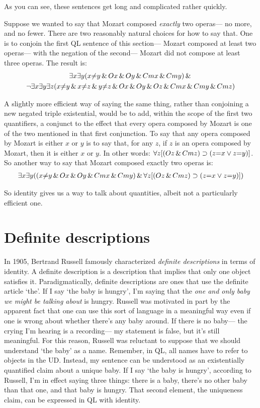 As you can see, these sentences get long and complicated rather quickly.

Suppose we wanted to say that Mozart composed \emph{exactly} two operas--- no more, and no fewer. There are two reasonably natural choices for how to say that. One is to conjoin the first QL sentence of this section--- Mozart composed at least two operas--- with the negation of the second--- Mozart did not compose at least three operas. The result is:
\begin{multline*}
\exists x \exists y (x {\neq} y \,\&\, Ox \,\&\, Oy \,\&\, Cmx \,\&\, Cmy) \,\&\, \\ \neg \exists x \exists y \exists z (x {\neq} y \,\&\, x {\neq} z \,\&\, y {\neq} z \,\&\, Ox \,\&\, Oy \,\&\, Oz \,\&\, Cmx \,\&\, Cmy \,\&\, Cmz)
\end{multline*}

A slightly more efficient way of saying the same thing, rather than conjoining a new negated triple existential, would be to add, within the scope of the first two quantifiers, a conjunct to the effect that every opera composed by Mozart is one of the two mentioned in that first conjunction. To say that any opera composed by Mozart is either $x$ or $y$ is to say that, for any $z$, if $z$ is an opera composed by Mozart, then it is either $x$ or $y$. In other words: $\forall z [(Oz \,\&\, Cmz) \supset (z{=}x \vee z{=}y)]$. So another way to say that Mozart composed exactly two operas is:
\begin{multline*}
\exists x \exists y ((x {\neq} y  \,\&\,  Ox \,\&\, Oy \,\&\,  Cmx \,\&\, Cmy) \,\&\, \forall z [(Oz \,\&\, Cmz) \supset (z{=}x \vee z{=}y)])
\end{multline*}

So identity gives us a way to talk about quantities, albeit not a particularly efficient one.



\section{Definite descriptions}
\label{sec.defdesc}
In 1905, Bertrand Russell famously characterized \emph{definite descriptions} in terms of identity. A definite description is a description that implies that only one object satisfies it. Paradigmatically, definite descriptions are ones that use the definite article `the'. If I say `the baby is hungry', I'm saying that the \emph{one and only baby we might be talking about} is hungry. Russell was motivated in part by the apparent fact that one can use this sort of language in a meaningful way even if one is wrong about whether there's any baby around. If there is no baby--- the crying I'm hearing is a recording--- my statement is false, but it's still meaningful. For this reason, Russell was reluctant to suppose that we should understand `the baby' as a name. Remember, in QL, all names have to refer to objects in the UD. Instead, my sentence can be understood as an existentially quantified claim about a unique baby. If I say `the baby is hungry', according to Russell, I'm in effect saying three things: there is a baby, there's no other baby than that one, and that baby is hungry. That second element, the uniqueness claim, can be expressed in QL with identity. 

